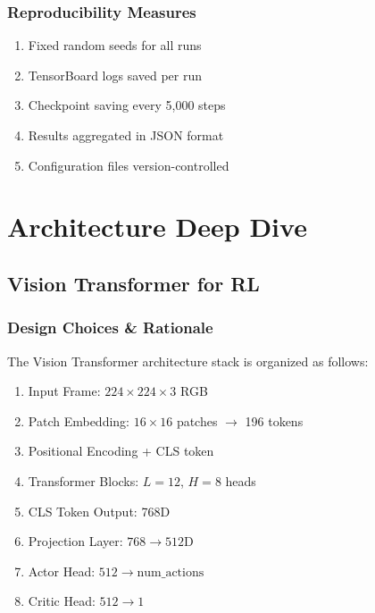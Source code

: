 \documentclass[12pt,a4paper,openany]{report}
\begin{document}
\subsection{Reproducibility Measures}

\begin{enumerate}
    \item Fixed random seeds for all runs
    \item TensorBoard logs saved per run
    \item Checkpoint saving every 5,000 steps
    \item Results aggregated in JSON format
    \item Configuration files version-controlled
\end{enumerate}

\chapter{Architecture Deep Dive}

\section{Vision Transformer for RL}

\subsection{Design Choices \& Rationale}

The Vision Transformer architecture stack is organized as follows:

\begin{enumerate}
    \item Input Frame: $224 \times 224 \times 3$ RGB
    \item Patch Embedding: $16 \times 16$ patches $\to$ 196 tokens
    \item Positional Encoding + CLS token
    \item Transformer Blocks: $L=12$, $H=8$ heads
    \item CLS Token Output: 768D
    \item Projection Layer: $768 \to 512$D
    \item Actor Head: $512 \to \text{num\_actions}$
    \item Critic Head: $512 \to 1$
\end{enumerate}
\end{document}
